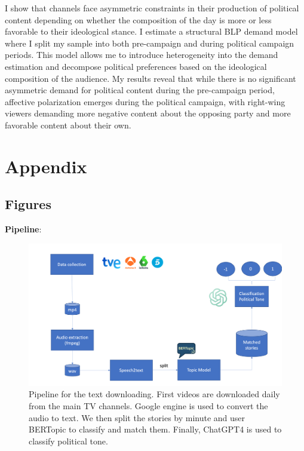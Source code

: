 \documentclass[12pt]{article}
\begin{document}
	I show that channels face asymmetric constraints  in their production of political content depending on whether the composition of the day is more or less favorable to their ideological stance. I estimate a structural BLP demand model where I split my sample into both pre-campaign and during political campaign periods. This model allows me to introduce heterogeneity into the demand estimation and decompose political preferences based on the  ideological composition of the audience. My results reveal that while there is no significant asymmetric demand for political content during the pre-campaign period, affective polarization emerges during the political campaign, with right-wing viewers demanding more negative content about the opposing party and more favorable content about their own.
	
	
	
	
	\clearpage
	
	\section{Appendix}
	
	
	
	
	
	
	
	
	
	
	\subsection{Figures}
	
	
	
	\textbf{Pipeline}:
	
	\begin{figure}[H]
		\centering
		\includegraphics[width=150mm]{figures/pipeline3}
		\caption{Pipeline for the text downloading. First videos are downloaded daily from the main TV channels. Google engine is used to convert the audio to text. We then split the stories by minute and user BERTopic to classify and match them. Finally, ChatGPT4 is used to classify political tone.}
		\label{fig:pipeline}
	\end{figure}
	
\end{document}
